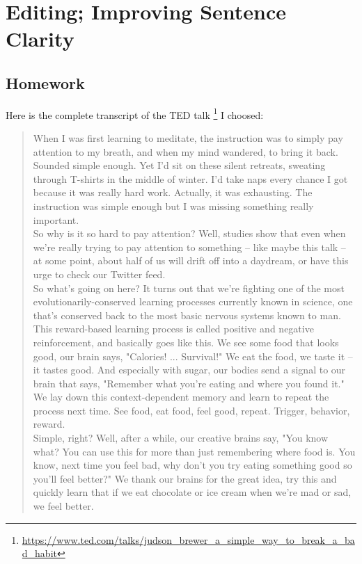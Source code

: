 
\chapter{Editing; Improving Sentence Clarity}

\section{Homework}

Here is the complete transcript of the TED talk
\footnote{\url{https://www.ted.com/talks/judson_brewer_a_simple_way_to_break_a_bad_habit}}
I choosed:
\begin{quote}
When I was first learning to meditate, the instruction was to simply pay attention to my breath, and when my mind wandered, to bring it back.\\
Sounded simple enough. Yet I'd sit on these silent retreats, sweating through T-shirts in the middle of winter. I'd take naps every chance I got because it was really hard work. Actually, it was exhausting. The instruction was simple enough but I was missing something really important.\\
So why is it so hard to pay attention? Well, studies show that even when we're really trying to pay attention to something -- like maybe this talk -- at some point, about half of us will drift off into a daydream, or have this urge to check our Twitter feed.\\
So what's going on here? It turns out that we're fighting one of the most evolutionarily-conserved learning processes currently known in science, one that's conserved back to the most basic nervous systems known to man.\\
This reward-based learning process is called positive and negative reinforcement, and basically goes like this. We see some food that looks good, our brain says, "Calories! ... Survival!" We eat the food, we taste it -- it tastes good. And especially with sugar, our bodies send a signal to our brain that says, "Remember what you're eating and where you found it." We lay down this context-dependent memory and learn to repeat the process next time. See food, eat food, feel good, repeat. Trigger, behavior, reward.\\
Simple, right? Well, after a while, our creative brains say, "You know what? You can use this for more than just remembering where food is. You know, next time you feel bad, why don't you try eating something good so you'll feel better?" We thank our brains for the great idea, try this and quickly learn that if we eat chocolate or ice cream when we're mad or sad, we feel better.\\

\end{quote}
